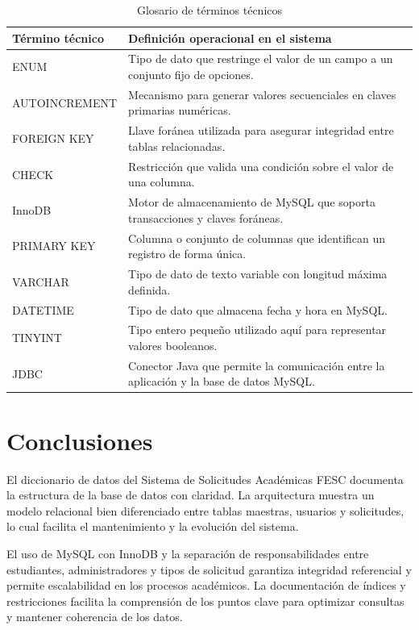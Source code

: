 \documentclass[12pt,letterpaper]{article}
\providecommand{\toprule}{}
\providecommand{\midrule}{}
\renewcommand{\toprule}{\hline}
\renewcommand{\midrule}{\hline}
\newcommand{\code}[1]{\texorpdfstring{\begingroup\normalfont\normalsize\def\_{\textunderscore\allowbreak}#1\endgroup}{#1}}
\begin{document}
\begin{longtable}{|L{0.22\textwidth}|L{0.68\textwidth}|}
\caption{Glosario de términos técnicos}\\
\toprule
\textbf{Término técnico} & \textbf{Definición operacional en el sistema} \\
\midrule
\code{ENUM} & Tipo de dato que restringe el valor de un campo a un conjunto fijo de opciones. \\
\hline
\code{AUTO\_INCREMENT} & Mecanismo para generar valores secuenciales en claves primarias numéricas. \\
\hline
\code{FOREIGN KEY} & Llave foránea utilizada para asegurar integridad entre tablas relacionadas. \\
\hline
\code{CHECK} & Restricción que valida una condición sobre el valor de una columna. \\
\hline
\code{InnoDB} & Motor de almacenamiento de MySQL que soporta transacciones y claves foráneas. \\
\hline
\code{PRIMARY KEY} & Columna o conjunto de columnas que identifican un registro de forma única. \\
\hline
\code{VARCHAR} & Tipo de dato de texto variable con longitud máxima definida. \\
\hline
\code{DATETIME} & Tipo de dato que almacena fecha y hora en MySQL. \\
\hline
\code{TINYINT} & Tipo entero pequeño utilizado aquí para representar valores booleanos. \\
\hline
\code{JDBC} & Conector Java que permite la comunicación entre la aplicación y la base de datos MySQL. \\
\end{longtable}

\section{Conclusiones}

El diccionario de datos del Sistema de Solicitudes Académicas FESC documenta la estructura de la base de datos con claridad. La arquitectura muestra un modelo relacional bien diferenciado entre tablas maestras, usuarios y solicitudes, lo cual facilita el mantenimiento y la evolución del sistema.

El uso de MySQL con InnoDB y la separación de responsabilidades entre estudiantes, administradores y tipos de solicitud garantiza integridad referencial y permite escalabilidad en los procesos académicos. La documentación de índices y restricciones facilita la comprensión de los puntos clave para optimizar consultas y mantener coherencia de los datos.
\end{document}

